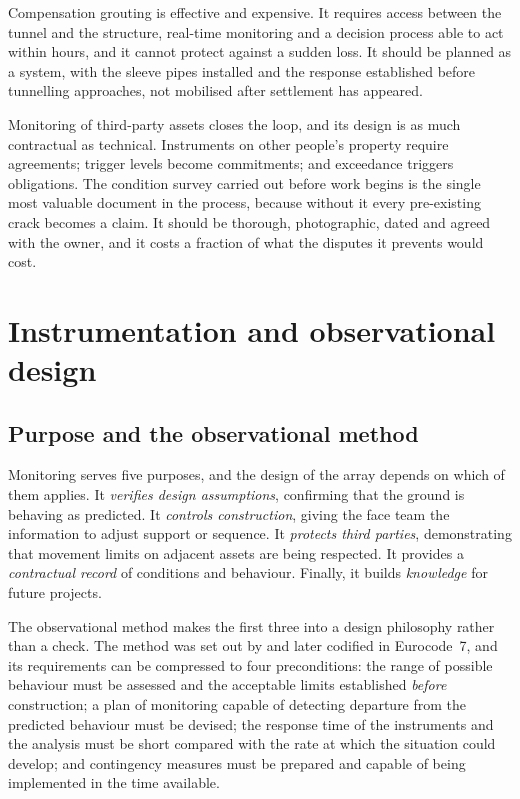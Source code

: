 Compensation grouting is effective and expensive. It requires access between the tunnel and the structure,
real-time monitoring and a decision process able to act within hours, and it
cannot protect against a sudden loss. It should be planned as a system,
with the sleeve pipes installed and the response established before tunnelling
approaches, not mobilised after settlement has appeared.

Monitoring of third-party assets closes the loop, and its design is as much
contractual as technical. Instruments on other people's property require
agreements; trigger levels become commitments; and exceedance triggers
obligations. The condition survey carried out before work begins is the single
most valuable document in the process, because without it every pre-existing
crack becomes a claim. It should be thorough, photographic, dated and agreed
with the owner, and it costs a fraction of what the disputes it prevents would cost.

\section{Instrumentation and observational design}
\label{sec:instrumentation-observational}

\subsection{Purpose and the observational method}
\label{sec:purpose-observational}

Monitoring serves five purposes, and the design of the array depends on
which of them applies. It \emph{verifies design
assumptions}, confirming that the ground is behaving as predicted. It
\emph{controls construction}, giving the face team the information to adjust
support or sequence. It \emph{protects third parties}, demonstrating that
movement limits on adjacent assets are being respected. It provides a
\emph{contractual record} of conditions and behaviour. Finally, it builds
\emph{knowledge} for future projects.

The observational method makes the first three into a design philosophy rather
than a check. The method was set out by \citet{peck1969observational} and
later codified in Eurocode~7, and its requirements can be compressed to four
preconditions: the range of possible behaviour must be
assessed and the acceptable limits established \emph{before} construction; a
plan of monitoring capable of detecting departure from the predicted behaviour
must be devised; the response time of the instruments and the analysis must be
short compared with the rate at which the situation could develop; and
contingency measures must be prepared and capable of being implemented in the
time available.

